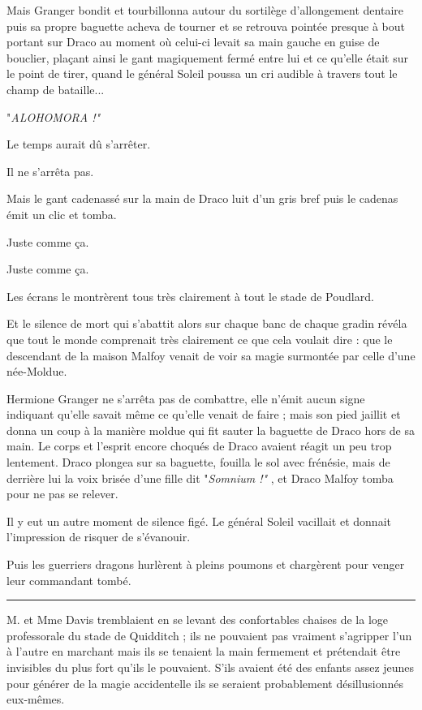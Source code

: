 Mais Granger bondit et tourbillonna autour du sortilège d'allongement dentaire puis sa propre baguette acheva de tourner et se retrouva pointée presque à bout portant sur Draco au moment où celui-ci levait sa main gauche en guise de bouclier, plaçant ainsi le gant magiquement fermé entre lui et ce qu'elle était sur le point de tirer, quand le général Soleil poussa un cri audible à travers tout le champ de bataille...

"\emph{ALOHOMORA !"} 

Le temps aurait dû s'arrêter.

Il ne s'arrêta pas.

Mais le gant cadenassé sur la main de Draco luit d'un gris bref puis le cadenas émit un clic et tomba.

Juste comme ça.

Juste comme ça.

Les écrans le montrèrent tous très clairement à tout le stade de Poudlard.

Et le silence de mort qui s'abattit alors sur chaque banc de chaque gradin révéla que tout le monde comprenait très clairement ce que cela voulait dire : que le descendant de la maison Malfoy venait de voir sa magie surmontée par celle d'une née-Moldue.

Hermione Granger ne s'arrêta pas de combattre, elle n'émit aucun signe indiquant qu'elle savait même ce qu'elle venait de faire ; mais son pied jaillit et donna un coup à la manière moldue qui fit sauter la baguette de Draco hors de sa main. Le corps et l'esprit encore choqués de Draco avaient réagit un peu trop lentement. Draco plongea sur sa baguette, fouilla le sol avec frénésie, mais de derrière lui la voix brisée d'une fille dit "\emph{Somnium !"} , et Draco Malfoy tomba pour ne pas se relever.

Il y eut un autre moment de silence figé. Le général Soleil vacillait et donnait l'impression de risquer de s'évanouir.

Puis les guerriers dragons hurlèrent à pleins poumons et chargèrent pour venger leur commandant tombé.
\par\noindent\rule{\textwidth}{0.4pt}
M. et Mme Davis tremblaient en se levant des confortables chaises de la loge professorale du stade de Quidditch ; ils ne pouvaient pas vraiment s'agripper l'un à l'autre en marchant mais ils se tenaient la main fermement et prétendait être invisibles du plus fort qu'ils le pouvaient. S'ils avaient été des enfants assez jeunes pour générer de la magie accidentelle ils se seraient probablement désillusionnés eux-mêmes.

